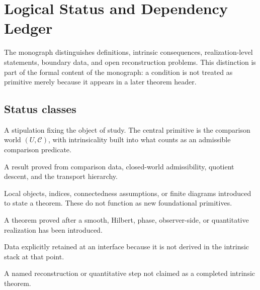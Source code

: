 \chapter*{Logical Status and Dependency Ledger}
{}
\label{ch:logical-status}
The monograph distinguishes definitions, intrinsic consequences,
realization-level statements, boundary data, and open reconstruction
problems.  This distinction is part of the formal content of the monograph:
a condition is not treated as primitive merely because it appears in a
later theorem header.

\section*{Status classes}
\begin{description}[leftmargin=3.5cm,style=nextline]
\item[Primitive definition]
A stipulation fixing the object of study.  The central primitive is the
comparison world \((U,\mathcal C)\), with intrinsicality built into what
counts as an admissible comparison predicate.
\item[Intrinsic theorem]
A result proved from comparison data, closed-world admissibility, quotient
descent, and the transport hierarchy.
\item[Scoped setup]
Local objects, indices, connectedness assumptions, or finite diagrams
introduced to state a theorem.  These do not function as new
foundational primitives.
\item[Realization-level theorem]
A theorem proved after a smooth, Hilbert, phase, observer-side, or
quantitative realization has been introduced.
\item[Boundary condition]
Data explicitly retained at an interface because it is not derived in
the intrinsic stack at that point.
\item[Open bridge]
A named reconstruction or quantitative step not claimed as a completed
intrinsic theorem.
\end{description}

